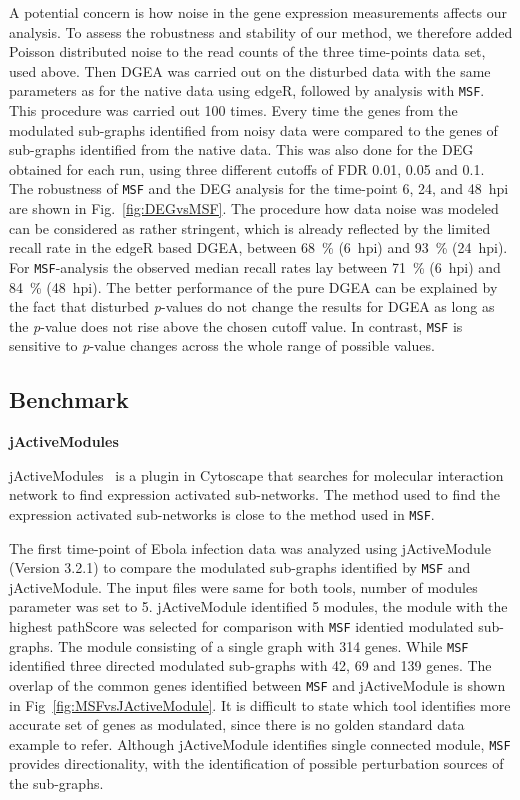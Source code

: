 \documentclass[10pt,a4paper,twocolumn]{article}
\begin{document}
	A potential concern is how noise in the gene expression measurements
	affects our analysis. To assess the robustness and stability of our method,
	we therefore added Poisson distributed noise
	to the read counts of the three time-points data set, used above.
	Then DGEA was carried out on the disturbed data
	with the same parameters as for the native data using edgeR, followed by
	analysis with \texttt{MSF}. This procedure was carried out 100 times.
	Every time the genes from the modulated sub-graphs identified from noisy
	data were compared to the genes of sub-graphs identified from the native
	data. This was also done for the DEG obtained for each run, using three different cutoffs of
	FDR 0.01, 0.05 and 0.1. The robustness of \texttt{MSF} and the DEG analysis
	for the time-point 6, 24, and 48~hpi are shown in
	Fig.~\ref{fig:DEGvsMSF}. The procedure how data noise was modeled can be
	considered as rather stringent, which is already reflected by the limited
	recall rate in the edgeR based DGEA, between 68~\% (6~hpi) and 93~\%
	(24~hpi). For \texttt{MSF}-analysis the observed median recall rates lay
	between 71~\% (6~hpi) and 84~\% (48~hpi). The better performance of the
	pure DGEA can be explained by the fact that disturbed \textit{p}-values do not
	change the results for DGEA as long as the \textit{p}-value does not rise above the
	chosen cutoff value. In contrast, \texttt{MSF} is sensitive to \textit{p}-value
	changes across the whole range of possible values.
	
	\subsection*{Benchmark}
	
	
	\textbf{jActiveModules}
	
	jActiveModules~\cite{jActiveModules} is a plugin in Cytoscape that searches for molecular interaction network to find expression activated sub-networks. The method used to find the expression activated sub-networks is close to the method used in \texttt{MSF}.
	
	The first time-point of Ebola infection data was analyzed using jActiveModule (Version 3.2.1) to compare the modulated sub-graphs identified by \texttt{MSF} and jActiveModule. The input files were same for both tools, number of modules parameter was set to 5. jActiveModule identified 5 modules, the module with the highest pathScore was selected for comparison with \texttt{MSF} identied modulated sub-graphs. The module consisting of a single graph with 314 genes. While \texttt{MSF} identified three directed modulated sub-graphs with 42, 69 and 139 genes. The overlap of the common genes identified between \texttt{MSF} and jActiveModule is shown in Fig~\ref{fig:MSFvsJActiveModule}. It is difficult to state which tool identifies more accurate set of genes as modulated, since there is no golden standard data example to refer. Although jActiveModule identifies single connected module, \texttt{MSF} provides directionality, with the identification of possible perturbation sources of the sub-graphs.
	
\end{document}
